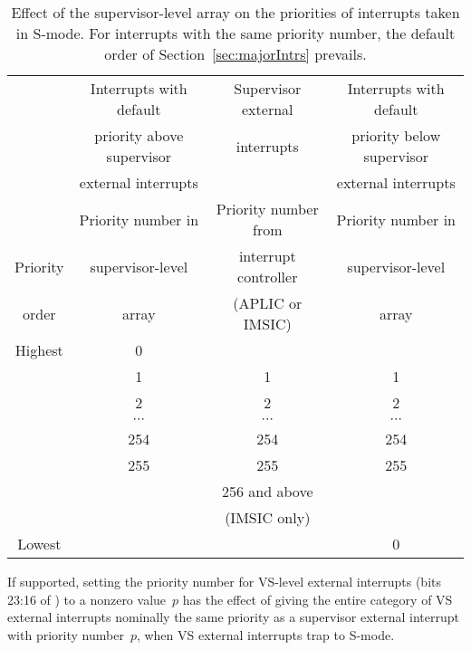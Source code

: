 \begin{table*}[h!]
\begin{center}
\begin{tabular}{|c|c|c|c|}
\hline
 & Interrupts with default  & Supervisor external & Interrupts with default \\
 & priority above supervisor & interrupts       & priority below supervisor \\
 & external interrupts       &                  & external interrupts \\
\hline
         & Priority number in & Priority number from & Priority number in \\
Priority & supervisor-level   & interrupt controller & supervisor-level \\
order    & \z{iprio} array    & (APLIC or IMSIC)     & \z{iprio} array \\
\hline
\hline
Highest  & 0                  &                      & \\
\cline{2-4}
         & 1                  & 1                    & 1 \\
         & 2                  & 2                    & 2 \\
         & $\cdots$           & $\cdots$             & $\cdots$ \\
         & 254                & 254                  & 254 \\
         & 255                & 255                  & 255 \\
\cline{2-4}
         &                    & 256 and above        & \\
         &                    & (IMSIC only)         & \\
\cline{2-4}
Lowest   &                    &                      & 0 \\
\hline
\end{tabular}
\end{center}
\caption{%
Effect of the supervisor-level  array on the priorities of
interrupts taken in \mbox{S-mode}.
For interrupts with the same priority number, the default order of
Section~\ref{sec:majorIntrs} prevails.%
}
\label{tab:intrPrios-S}
\end{table*}

If supported, setting the priority number for VS-level external
interrupts (bits 23:16 of ) to a nonzero value~$p$ has
the effect of giving the entire category of VS external interrupts
nominally the same priority as a supervisor external interrupt with
priority number~$p$, when VS external interrupts trap to \mbox{S-mode}.

